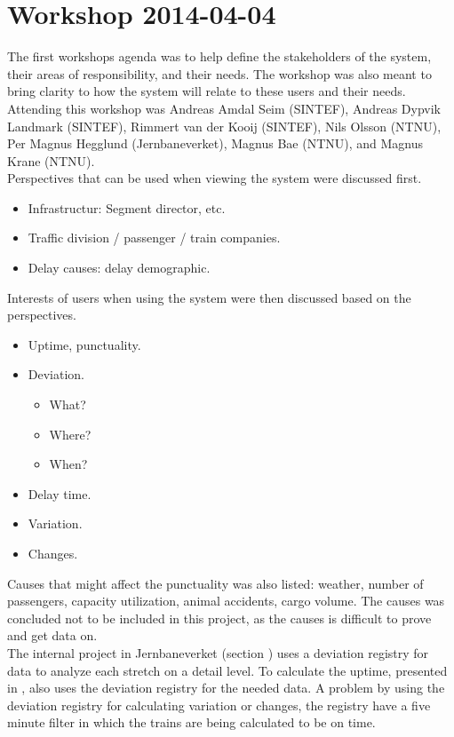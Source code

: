 
\section{Workshop 2014-04-04} %
\label{sec:workshop_2014_04_04}
The first workshops agenda was to help define the stakeholders of the system,
their areas of responsibility, and their needs. The workshop was also meant to 
bring clarity to how the system will relate to these users and their needs.
Attending this workshop was Andreas Amdal Seim (SINTEF), Andreas Dypvik 
Landmark (SINTEF), Rimmert van der Kooij (SINTEF), Nils Olsson (NTNU), Per 
Magnus Hegglund (Jernbaneverket), Magnus Bae (NTNU), and Magnus Krane (NTNU).\\

Perspectives that can be used when viewing the system were discussed
first.
\begin{itemize}
	\item Infrastructur: Segment director, etc.
	\item Traffic division / passenger / train companies.
	\item Delay causes: delay demographic.
\end{itemize}

Interests of users when using the system were then discussed based on the
perspectives.
\begin{itemize}
	\item Uptime, punctuality.
	\item Deviation.
	\begin{itemize}
		\item What?
		\item Where?
		\item When?
	\end{itemize}
	\item Delay time.
	\item Variation.
	\item Changes.
\end{itemize}

Causes that might affect the punctuality was also listed: weather, number of
passengers, capacity utilization, animal accidents, cargo volume.
The causes was concluded not to be included in this project, as the causes is
difficult to prove and get data on.\\

The internal project in Jernbaneverket (section
) uses a deviation registry for data to
analyze each stretch on a detail level. To calculate the uptime, presented in
, also uses the deviation registry for the needed
data. A problem by using the deviation registry for calculating variation or 
changes, the registry have a five minute filter in which the trains are being 
calculated to be on time.

